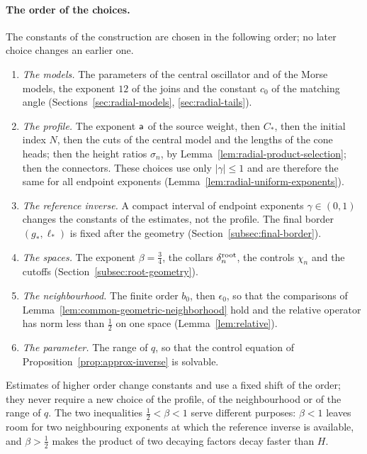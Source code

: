 \paragraph{The order of the choices.}
The constants of the construction are chosen in the following order;
no later choice changes an earlier one.
\begin{enumerate}[label=\textup{\arabic*.}]
\item \emph{The models.} The parameters of the central oscillator and
 of the Morse models, the exponent $12$ of the joins and the
 constant $c_0$ of the matching angle
 (Sections~\ref{sec:radial-models}, \ref{sec:radial-tails}).
\item \emph{The profile.} The exponent $\mathsf a$ of the source weight,
 then $C_*$, then the initial index $N$, then the cuts of the central
 model and the lengths of the cone heads; then the height ratios
 $\sigma_n$, by Lemma~\ref{lem:radial-product-selection}; then the
 connectors. These choices use only $|\gamma|\le1$ and are therefore
 the same for all endpoint exponents
 (Lemma~\ref{lem:radial-uniform-exponents}).
\item \emph{The reference inverse.} A compact interval of endpoint
 exponents $\gamma\in(0,1)$ changes the constants of the estimates,
 not the profile. The final border $(g_*,\ell_*)$ is fixed after the
 geometry (Section~\ref{subsec:final-border}).
\item \emph{The spaces.} The exponent $\beta=\tfrac34$, the collars
 $\delta_n^{\rm root}$, the controls $\chi_n$ and the cutoffs
 (Section~\ref{subsec:root-geometry}).
\item \emph{The neighbourhood.} The finite order $b_0$, then
 $\epsilon_0$, so that the comparisons of
 Lemma~\ref{lem:common-geometric-neighborhood} hold and the relative
 operator has norm less than $\tfrac12$ on one space
 (Lemma~\ref{lem:relative}).
\item \emph{The parameter.} The range of $q$, so that the control
 equation of Proposition~\ref{prop:approx-inverse} is solvable.
\end{enumerate}
Estimates of higher order change constants and use a fixed shift of
the order; they never require a new choice of the profile, of the
neighbourhood or of the range of $q$. The two inequalities
$\tfrac12<\beta<1$ serve different purposes: $\beta<1$ leaves room for
two neighbouring exponents at which the reference inverse is
available, and $\beta>\tfrac12$ makes the product of two decaying
factors decay faster than $H$.
